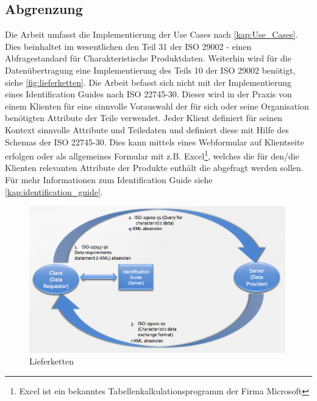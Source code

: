 \subsection{Abgrenzung}

Die Arbeit umfasst die Implementierung der Use Cases nach \autoref{kap:Use_Cases}. Dies beinhaltet im wesentlichen den Teil 31 der ISO 29002 - einen Abfragestandard für Charakteristische Produktdaten. 
Weiterhin wird für die Datenübertragung eine Implementierung des Teils 10 der ISO 29002 benötigt, siehe \autoref{fig:lieferketten}. 
Die Arbeit befasst sich nicht mit der Implementierung eines Identification Guides nach ISO 22745-30. Dieser wird in der Praxis von einem Klienten für eine sinnvolle Vorauswahl der für sich oder seine Organisation benötigten Attribute der Teile verwendet. Jeder Klient definiert für seinen Kontext sinnvolle Attribute und Teiledaten und definiert diese mit Hilfe des Schemas der ISO 22745-30. Dies kann mittels eines Webformular auf Klientseite erfolgen oder als allgemeines Formular mit z.B. Excel\footnote{Excel ist ein bekanntes Tabellenkalkulationsprogramm der Firma Microsoft}, welches die für den/die Klienten relevanten Attribute der Produkte enthält die abgefragt werden sollen. Für mehr Informationen zum Identification Guide siehe \autoref{kap:identification_guide}.

\begin{figure}[htbp]
	\centering
		\includegraphics[width=0.99\textwidth]{images/lieferketten_plib.png}
		\caption[Lieferketten]{Lieferketten\footnotemark}
	\label{fig:lieferketten}
\end{figure}

